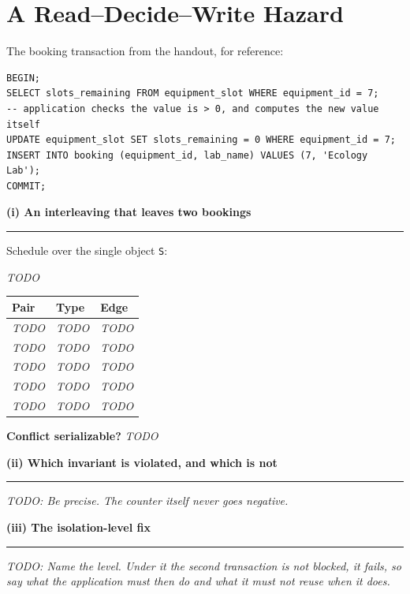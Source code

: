 \documentclass[11pt, a4paper]{article}
\newcommand{\divider}{\par\noindent\rule{\linewidth}{0.3pt}\smallskip}
\begin{document}
\section{A Read--Decide--Write Hazard}

\noindent The booking transaction from the handout, for reference:

\begin{lstlisting}
BEGIN;
SELECT slots_remaining FROM equipment_slot WHERE equipment_id = 7;
-- application checks the value is > 0, and computes the new value itself
UPDATE equipment_slot SET slots_remaining = 0 WHERE equipment_id = 7;
INSERT INTO booking (equipment_id, lab_name) VALUES (7, 'Ecology Lab');
COMMIT;
\end{lstlisting}

\bigskip
\textbf{(i) An interleaving that leaves two bookings}
\divider

\noindent Schedule over the single object \texttt{S}:

\smallskip
\noindent\textit{TODO}

\smallskip
\begin{center}
\begin{tabular}{@{}lll@{}}
\toprule
\textbf{Pair} & \textbf{Type} & \textbf{Edge} \\
\midrule
\textit{TODO} & \textit{TODO} & \textit{TODO} \\
\textit{TODO} & \textit{TODO} & \textit{TODO} \\
\textit{TODO} & \textit{TODO} & \textit{TODO} \\
\textit{TODO} & \textit{TODO} & \textit{TODO} \\
\textit{TODO} & \textit{TODO} & \textit{TODO} \\
\bottomrule
\end{tabular}
\end{center}

\noindent\textbf{Conflict serializable?} \textit{TODO}

\bigskip
\textbf{(ii) Which invariant is violated, and which is not}
\divider

\textit{TODO: Be precise. The counter itself never goes negative.}

\bigskip
\textbf{(iii) The isolation-level fix}
\divider

\textit{TODO: Name the level. Under it the second transaction is not blocked,
it fails, so say what the application must then do and what it must not
reuse when it does.}
\end{document}
